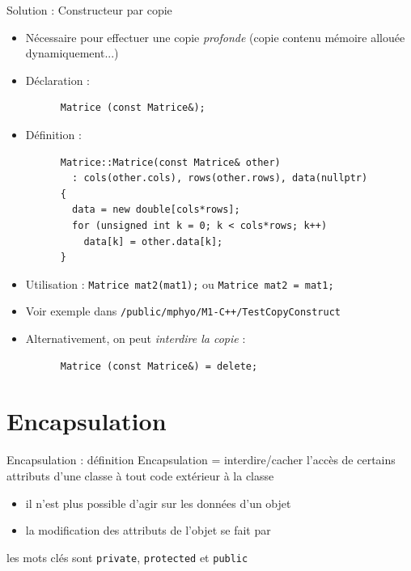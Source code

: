 \documentclass[c]{beamer}
\newcommand{\inline}[1]{\texttt{#1}}
\begin{document}

\begin{frame}[fragile]{Solution : Constructeur par copie}
  \begin{itemize}
  \item Nécessaire pour effectuer une copie \emph{profonde} (copie contenu mémoire allouée dynamiquement...)
  \item Déclaration :
    \begin{verbatim}
      Matrice (const Matrice&);
    \end{verbatim}
  \item Définition :
    \begin{verbatim}
      Matrice::Matrice(const Matrice& other)
        : cols(other.cols), rows(other.rows), data(nullptr)
      {
        data = new double[cols*rows];
        for (unsigned int k = 0; k < cols*rows; k++)
          data[k] = other.data[k];   
      }
    \end{verbatim}
    \item Utilisation : \texttt{Matrice mat2(mat1);} ou \texttt{Matrice mat2 = mat1;}
    \item Voir exemple dans \texttt{/public/mphyo/M1-C++/TestCopyConstruct}
    \item Alternativement, on peut \emph{interdire la copie} :
    \begin{verbatim}
      Matrice (const Matrice&) = delete;
    \end{verbatim}
  \end{itemize}
\end{frame}


\section{Encapsulation}

\begin{frame}[fragile]{Encapsulation : définition}
Encapsulation = interdire/cacher l'accès de certains attributs d'une classe à tout code extérieur à la classe

\begin{itemize}
\item il n'est plus possible d'agir  sur les données d'un objet

\item la modification des attributs de l'objet se fait par 
\end{itemize}

 les mots clés sont \inline{private}, \inline{protected} et \inline{public}
\end{frame}
\end{document}
